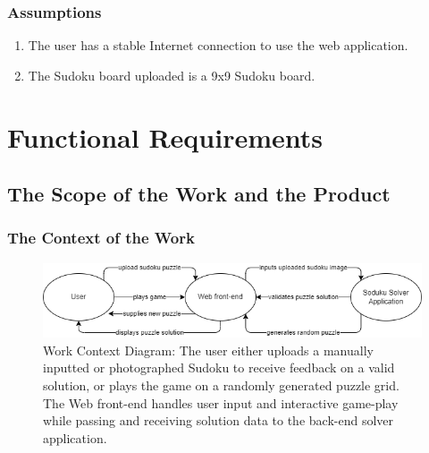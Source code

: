 \documentclass[11pt]{article}
\begin{document}
\subsubsection{Assumptions}

\begin{enumerate}
    \item The user has a stable Internet connection to use the web application.
    \item The Sudoku board uploaded is a 9x9 Sudoku board.
\end{enumerate}

\section{Functional Requirements}

\subsection{The Scope of the Work and the Product}

\subsubsection{The Context of the Work}
\begin{figure}[H]
    \centering
    \includegraphics[width=\textwidth]{sudoku_scope}
    \caption{Work Context Diagram: The user either uploads a manually inputted or photographed Sudoku to receive feedback on a valid solution, or plays the game on a randomly generated puzzle grid. The Web front-end handles user input and interactive game-play while passing and receiving solution data to the back-end solver application.}
    \label{fig:my_label}
\end{figure}
\end{document}

